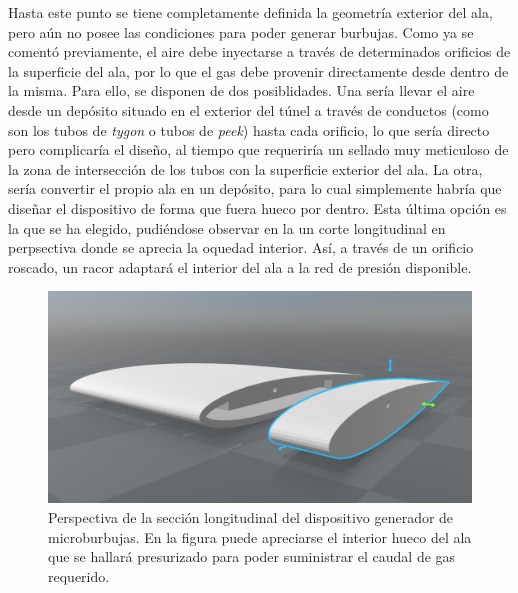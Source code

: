 Hasta este punto se tiene completamente definida la geometría exterior del ala, pero aún no posee las condiciones para poder generar burbujas. Como ya se comentó previamente, el aire debe inyectarse a través de determinados orificios de la  superficie del ala, por lo que el gas debe provenir directamente desde dentro de la misma. Para ello, se disponen de dos posiblidades. Una sería llevar el aire  desde un depósito situado en el exterior del túnel a través de conductos (como son los tubos de \emph{tygon} o tubos de \emph{peek}) hasta cada orificio, lo que sería directo pero complicaría el diseño, al tiempo que requeriría un sellado muy meticuloso de la zona de intersección de los tubos con la superficie exterior del ala. La otra, sería convertir el propio ala en un depósito, para lo cual simplemente habría que diseñar el dispositivo de forma que fuera hueco por dentro. Esta última opción es la que se ha elegido, pudiéndose observar en la  un corte longitudinal en perpsectiva donde se aprecia la oquedad interior. Así, a través de  un orificio roscado, un racor adaptará el interior del ala a la red de presión disponible. 

\begin{figure}
\includegraphics[scale=0.5]{ala2D/figuras/seccionAla.png}
\caption{Perspectiva de la sección longitudinal del dispositivo generador de microburbujas. En la figura puede apreciarse el interior hueco del ala que se hallará presurizado para poder suministrar el caudal de gas requerido. }
\end{figure}

